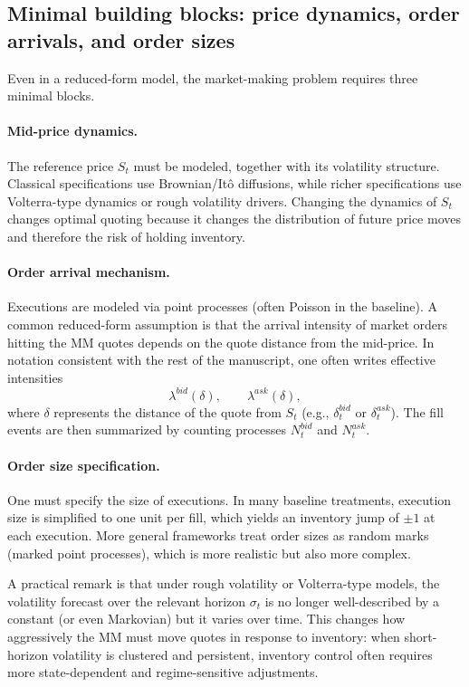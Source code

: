 \subsection{Minimal building blocks: price dynamics, order arrivals, and order sizes}
Even in a reduced-form model, the market-making problem requires three minimal blocks.

\paragraph{Mid-price dynamics.}
The reference price $S_t$ must be modeled, together with its volatility structure. Classical specifications use Brownian/It\^o diffusions, while richer specifications use Volterra-type dynamics or rough volatility drivers. Changing the dynamics of $S_t$ changes optimal quoting because it changes the distribution of future price moves and therefore the risk of holding inventory.

\paragraph{Order arrival mechanism.}
Executions are modeled via point processes (often Poisson in the baseline). A common reduced-form assumption is that the arrival intensity of market orders hitting the MM quotes depends on the quote distance from the mid-price. In notation consistent with the rest of the manuscript, one often writes effective intensities
\[
\lambda^{bid}(\delta), \qquad \lambda^{ask}(\delta),
\]
where $\delta$ represents the distance of the quote from $S_t$ (e.g., $\delta_t^{bid}$ or $\delta_t^{ask}$). The fill events are then summarized by counting processes $N_t^{bid}$ and $N_t^{ask}$.

\paragraph{Order size specification.}
One must specify the size of executions. In many baseline treatments, execution size is simplified to one unit per fill, which yields an inventory jump of $\pm 1$ at each execution. More general frameworks treat order sizes as random marks (marked point processes), which is more realistic but also more complex.

A practical remark is that under rough volatility or Volterra-type models, the volatility forecast over the relevant horizon $\sigma_t$ is no longer well-described by a constant (or even Markovian) but it varies over time. This changes how aggressively the MM must move quotes in response to inventory: when short-horizon volatility is clustered and persistent, inventory control often requires more state-dependent and regime-sensitive adjustments.

